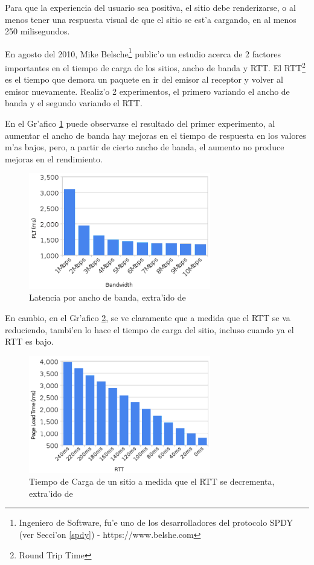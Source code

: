 Para que la experiencia del usuario sea positiva, el sitio debe renderizarse, o al menos tener una respuesta visual de que el sitio se est'a cargando, en al menos 250 milisegundos.

En agosto del 2010, Mike Belsche\footnote{Ingeniero de Software, fu'e uno de los desarrolladores del protocolo SPDY (ver Secci'on \ref{spdy}) - https://www.belshe.com} public'o un estudio \citep{moreBand} acerca de 2 factores importantes en el tiempo de carga de los sitios, ancho de banda y RTT. El RTT\footnote{Round Trip Time} es el tiempo que demora un paquete en ir del emisor al receptor y volver al emisor nuevamente.
Realiz'o 2 experimentos, el primero variando el ancho de banda y el segundo variando el RTT.

En el Gr'afico \ref{belshePLTxBW} puede observarse el resultado del primer experimento, al aumentar el ancho de banda hay mejoras en el tiempo de respuesta en los valores m'as bajos, pero, a partir de cierto ancho de banda, el aumento no produce mejoras en el rendimiento.

\begin{figure}[ht]
	\begin{center}
	\includegraphics[width=300px]{img/belshePLTxBW}
	\caption{\small Latencia por ancho de banda, extra'ido de \citep{moreBand}}
	\end{center}
	\label{belshePLTxBW}
\end{figure}

\vspace{2cm}

En cambio, en el Gr'afico \ref{belshePLTxRTT}, se ve claramente que a medida que el RTT se va reduciendo, tambi'en lo hace el tiempo de carga del sitio, incluso cuando ya el RTT es bajo.

\begin{figure}[ht!]
	\begin{center}
	\includegraphics[width=300px]{img/belshePLTxRTT}
	\caption{\small Tiempo de Carga de un sitio a medida que el RTT se decrementa, extra'ido de \citep{moreBand}}
	\end{center}
	\label{belshePLTxRTT}
\end{figure}

